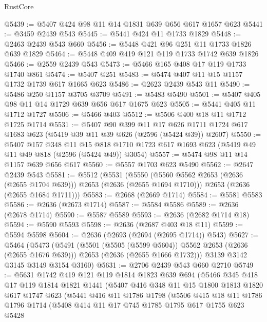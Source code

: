 \begin{lexlean}{RustCore}
\begin{coremodule}
@5439 := @5407 @424 @98 @11 @14 @1831 @639 @656 @617 @1657 @623
@5441 := @3459 @2439 @543
@5445 := @5441 @424 @11 @1733 @1829
@5448 := @2463 @2439 @543 @660
@5456 := @5448 @421 @96 @251 @11 @1733 @1826 @639 @1829
@5464 := @5448 @409 @419 @121 @119 @1733 @1742 @639 @1826
@5466 := @2559 @2439 @543
@5473 := @5466 @165 @408 @17 @119 @1733 @1740 @861
@5474 := @5407 @251
@5483 := @5474 @407 @11 @15 @1157 @1732 @1739 @617 @1665 @623
@5486 := @2623 @2439 @543 @11
@5490 := @5486 @250 @1157 @3705 @3709
@5491 := @5483 @5490
@5501 := @5407 @405 @98 @11 @14 @1729 @639 @656 @617 @1675 @623
@5505 := @5441 @405 @11 @1712 @1727
@5506 := @5466 @403
@5512 := @5506 @400 @18 @11 @1712 @1725 @1714
@5531 := @5407
    @90
    @399
    @11
    @17
    @626
    @1711
    @1724
    @617
    @1683
    @623
    (@5419 @39 @11 @39 @626 (@2596 (@5424 @39)) @2607)
@5550 := @5407
    @157
    @348
    @11
    @15
    @818
    @1710
    @1723
    @617
    @1693
    @623
    (@5419 @49 @11 @49 @818 (@2596 (@5424 @49)) @3054)
@5557 := @5474 @98 @11 @14 @1157 @639 @656 @617
@5560 := @5557 @1703 @623 @5490
@5562 := @2647 @2439 @543
@5581 := @5512
    (@5531
      (@5550 (@5560 @5562 @2653 (@2636 (@2655 @1704 @639))) @2653 (@2636 (@2655 @1694 @1710)))
      @2653
      (@2636 (@2655 @1684 @1711)))
@5583 := @2668 (@2669 @1714)
@5584 := @5581 @5583
@5586 := @2636 (@2673 @1714)
@5587 := @5584 @5586
@5589 := @2636 (@2678 @1714)
@5590 := @5587 @5589
@5593 := @2636 (@2682 @1714 @18)
@5594 := @5590 @5593
@5598 := @2636 (@2687 @403 @18 @11)
@5599 := @5594 @5598
@5604 := @2636 (@2693 (@2694 (@2695 @1714)) @543)
@5627 := @5464
    (@5473
      (@5491
        (@5501 (@5505 (@5599 @5604)) @5562 @2653 (@2636 (@2655 @1676 @639)))
        @2653
        (@2636 (@2655 @1666 @1732)))
      @3139
      @3142
      @3145
      @3149
      @3154
      @3160)
@5631 := @2706 @2439 @543 @660 @2710
@5749 := @5631
    @1742
    @419
    @121
    @119
    @1814
    @1823
    @639
    @694
    (@5466
      @345
      @418
      @17
      @119
      @1814
      @1821
      @1441
      (@5407
        @416
        @348
        @11
        @15
        @1800
        @1813
        @1820
        @617
        @1747
        @623
        (@5441
          @416
          @11
          @1786
          @1798
          (@5506
            @415
            @18
            @11
            @1786
            @1796
            @1714
            (@5408
              @414
              @11
              @17
              @745
              @1785
              @1795
              @617
              @1755
              @623
              @5428

\end{coremodule}
\end{lexlean}

